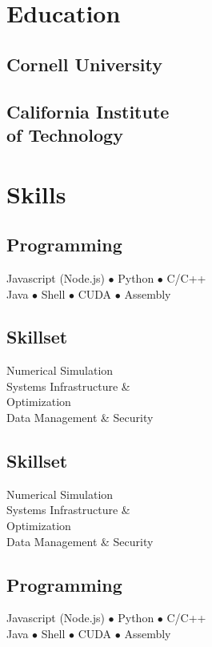 \documentclass[]{yubo-resume-openfont}
\begin{document}
\begin{minipage}[t]{0.33\textwidth}


\section{Education}
    \subsection[Cornell]{Cornell University}
    \sectionsep
    \subsection[CIT]{California Institute\\
        of Technology}
\sectionsep


\def\ProgrammingSkills{
    \subsection{Programming}
    Javascript (Node.js) $\bullet$ Python $\bullet$ C/C++\\
    Java $\bullet$ Shell $\bullet$ CUDA $\bullet$ Assembly\\
}
\def\Skillset{
    \subsection{Skillset}
    Numerical Simulation\\
    Systems Infrastructure \&\\
        \tab Optimization\\
    Data Management \& Security
}

\section{Skills}
    \ifisCS
        \ProgrammingSkills
        \sectionsep
        \Skillset
    \else
        \Skillset
        \sectionsep
        \ProgrammingSkills
    \fi
    \sectionsep

\end{minipage}
\end{document}
